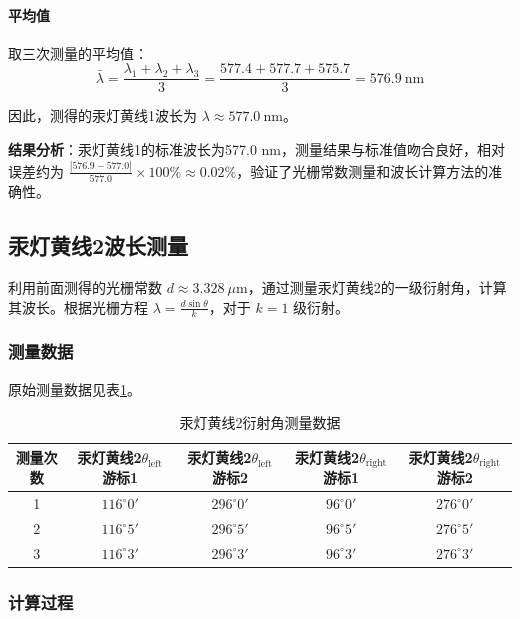 \documentclass[11pt]{article}
\begin{document}
\paragraph{平均值}

取三次测量的平均值：
\[
\bar{\lambda} = \frac{\lambda_1 + \lambda_2 + \lambda_3}{3} = \frac{577.4 + 577.7 + 575.7}{3} = 576.9\ \text{nm}
\]

因此，测得的汞灯黄线1波长为 \(\lambda \approx 577.0\ \text{nm}\)。

\textbf{结果分析}：汞灯黄线1的标准波长为577.0 nm，测量结果与标准值吻合良好，相对误差约为 \(\frac{|576.9-577.0|}{577.0} \times 100\% \approx 0.02\%\)，验证了光栅常数测量和波长计算方法的准确性。

\subsection{汞灯黄线2波长测量}

利用前面测得的光栅常数 \(d \approx 3.328\ \mu\text{m}\)，通过测量汞灯黄线2的一级衍射角，计算其波长。根据光栅方程 \(\lambda = \frac{d\sin\theta}{k}\)，对于 \(k=1\) 级衍射。

\subsubsection{测量数据}

原始测量数据见表\ref{tab:yellow_line2_data}。

\begin{table}[htbp]
  \centering
  \caption{汞灯黄线2衍射角测量数据}
  \vspace{0.5em}
  \label{tab:yellow_line2_data}
  \begin{tabular}{ccccc}
    \toprule
    测量次数 & 汞灯黄线2\(\theta_{\text{left}}\)游标1 & 汞灯黄线2\(\theta_{\text{left}}\)游标2 & 汞灯黄线2\(\theta_{\text{right}}\)游标1 & 汞灯黄线2\(\theta_{\text{right}}\)游标2 \\
    \midrule
    1 & \(116^\circ0'\) & \(296^\circ0'\) & \(96^\circ0'\) & \(276^\circ0'\) \\
    2 & \(116^\circ5'\) & \(296^\circ5'\) & \(96^\circ5'\) & \(276^\circ5'\) \\
    3 & \(116^\circ3'\) & \(296^\circ3'\) & \(96^\circ3'\) & \(276^\circ3'\) \\
    \bottomrule
  \end{tabular}
\end{table}

\subsubsection{计算过程}
\end{document}
